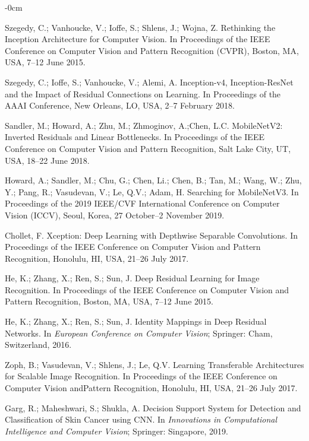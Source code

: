 \documentclass[sensors,article,accept,pdftex,moreauthors]{Definitions/mdpi}
\begin{document}
\begin{adjustwidth}{-\extralength}{0cm}
\begin{thebibliography}{999}
Szegedy, C.; Vanhoucke, V.; Ioffe, S.; Shlens, J.; Wojna, Z.  Rethinking the Inception Architecture for Computer Vision.
In Proceedings of the IEEE Conference on Computer Vision and Pattern {Recognition (CVPR),} Boston, MA, USA, 7--12 June 
{2015}.

Szegedy, C.; Ioffe, S.; Vanhoucke, V.; Alemi, A. Inception-v4, Inception-ResNet and the Impact of Residual Connections on Learning.
{In Proceedings of the AAAI Conference}, New Orleans, LO, USA,
2--7 February {2018}.

Sandler, M.; Howard, A.; Zhu, M.; Zhmoginov, A.;Chen, L.C. MobileNetV2: Inverted Residuals and Linear Bottlenecks.
In Proceedings of the IEEE Conference on Computer Vision and {Pattern Recognition,} Salt Lake City, UT, USA, 18--22 June 
{2018}.

Howard, A.; Sandler, M.; Chu, G.; Chen, Li.; Chen, B.; Tan, M.; Wang, W.; Zhu, Y.; Pang, R.; Vasudevan, V.; Le, Q.V.; Adam, H. Searching for MobileNetV3.
In Proceedings of the 2019 IEEE/CVF International Conference on {Computer Vision (ICCV), Seoul, Korea, 27 October--2 November 2019.}

Chollet, F. Xception: Deep Learning with Depthwise Separable Convolutions.
In Proceedings of the IEEE Conference on Computer Vision and {Pattern Recognition,}  Honolulu, HI, USA, 21--26 July {2017}.

He, K.; Zhang, X.; Ren, S.; Sun, J. Deep Residual Learning for Image Recognition.
In Proceedings of the IEEE Conference on Computer Vision and {Pattern Recognition, } Boston, MA, USA, 7--12 June 
{2015}.

He, K.; Zhang, X.; Ren, S.; Sun, J. Identity Mappings in Deep Residual Networks.
In \emph{European Conference on Computer Vision}; Springer: Cham, Switzerland,
{2016}.

Zoph, B.; Vasudevan, V.; Shlens, J.; Le, Q.V. Learning Transferable Architectures for Scalable Image Recognition. 
In Proceedings of the IEEE Conference on Computer Vision and{Pattern Recognition, }  Honolulu, HI, USA, 21--26 July 
{2017}.

Garg, R.; Maheshwari, S.; Shukla, A. Decision Support System for Detection and Classification of Skin Cancer using CNN. In \emph{Innovations in Computational Intelligence and Computer Vision}; Springer: Singapore, {2019}.


\end{thebibliography}
\end{adjustwidth}
\end{document}
